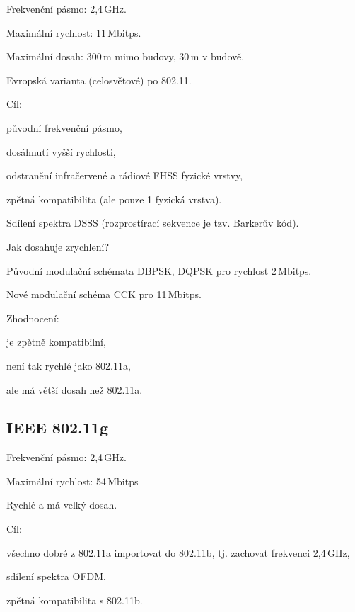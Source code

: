 \begin{compactitem}
    \item Frekvenční pásmo: 2,4\,GHz.
    \item Maximální rychlost: 11\,Mbitps.
    \item Maximální dosah: 300\,m mimo budovy, 30\,m v budově.
    \item Evropská varianta (celosvětové) po 802.11.

    \item Cíl: \begin{compactitem}
        \item původní frekvenční pásmo,
        \item dosáhnutí vyšší rychlosti,
        \item odstranění infračervené a rádiové FHSS fyzické vrstvy,
        \item zpětná kompatibilita (ale pouze 1 fyzická vrstva).
    \end{compactitem}

    \item Sdílení spektra DSSS (rozprostírací sekvence je tzv. Barkerův kód).

    \item Jak dosahuje zrychlení? \begin{compactitem}
        \item Původní modulační schémata DBPSK, DQPSK pro rychlost 2\,Mbitps.
        \item Nové modulační schéma CCK pro 11\,Mbitps.
    \end{compactitem}

    \item Zhodnocení: \begin{compactitem}
        \item je zpětně kompatibilní,
        \item není tak rychlé jako 802.11a,
        \item ale má větší dosah než 802.11a.
    \end{compactitem}
\end{compactitem}

\subsection{IEEE 802.11g}

\begin{compactitem}
    \item Frekvenční pásmo: 2,4\,GHz.
    \item Maximální rychlost: 54\,Mbitps
    \item Rychlé a má velký dosah.

    \item Cíl: \begin{compactitem}
        \item všechno dobré z 802.11a importovat do 802.11b, tj. zachovat frekvenci 2,4\,GHz,
        \item sdílení spektra OFDM,
        \item zpětná kompatibilita s 802.11b.
    \end{compactitem}

\end{compactitem}

